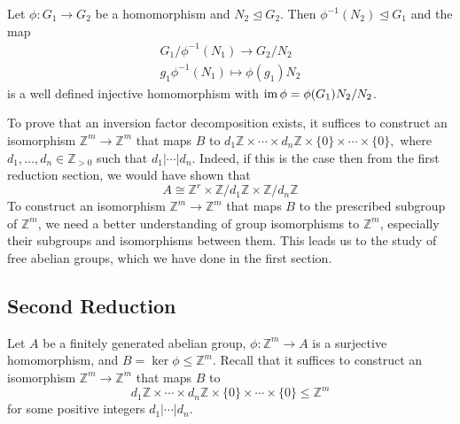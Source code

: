 \documentclass{article}
\begin{document}
\begin{idea}
    Let $\phi: G_1\rightarrow G_2$ be a homomorphism and $N_2 \trianglelefteq G_2$. Then $\phi^{-1}(N_2) \trianglelefteq G_1$ and the map
    \begin{align*}
        G_1/\phi^{-1}(N_1) \rightarrow G_2/N_2 \\
        g_1\phi^{-1}(N_1) \mapsto \phi(g_1)N_2
    \end{align*}
    is a well defined injective homomorphism with $\operatorname{im}{\phi}=\phi(G_1)N_2/N_2$.
\end{idea}
To prove that an inversion factor decomposition exists, it suffices to construct an isomorphism $\mathbb{Z}^m \rightarrow \mathbb{Z}^m$ that maps $B$ to $d_1\mathbb{Z} \times \cdots \times d_n\mathbb{Z} \times \{0\} \times \cdots \times \{0\},$ where $d_1,\dots,d_n \in \mathbb{Z}_{>0}$ such that $d_1|\cdots|d_n$. Indeed, if this is the case then from the first reduction section, we would have shown that
\begin{equation}
    A \cong \mathbb{Z}^r \times \mathbb{Z}/d_1\mathbb{Z} \times \mathbb{Z}/d_n\mathbb{Z}
\end{equation}
To construct an isomorphism $\mathbb{Z}^m \rightarrow \mathbb{Z}^m$ that maps $B$ to the prescribed subgroup of $\mathbb{Z}^m$, we need a better understanding of group isomorphisms to $\mathbb{Z}^m$, especially their subgroups and isomorphisms between them. This leads us to the study of free abelian groups, which we have done in the first section.

\subsection{Second Reduction}
Let $A$ be a finitely generated abelian group, $\phi: \mathbb{Z}^m \rightarrow A$ is a surjective homomorphism, and $B=\ker\phi \le \mathbb{Z}^m$. Recall that it suffices to construct an isomorphism $\mathbb{Z}^m \rightarrow \mathbb{Z}^m$ that maps $B$ to $$d_1\mathbb{Z} \times \cdots \times d_n\mathbb{Z} \times \{0\} \times \cdots \times \{0\} \le \mathbb{Z}^m$$
for some positive integers $d_1|\cdots | d_n$.
\end{document}

